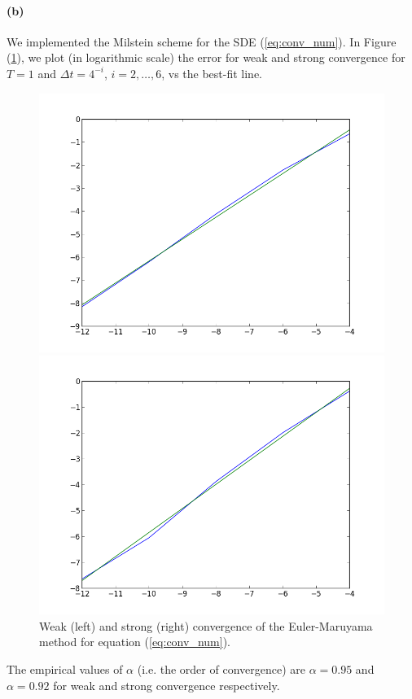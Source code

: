 \documentclass[a4paper,11pt]{article}
\theoremstyle{definition}
\theoremstyle{plain}
\theoremstyle{remark}
\begin{document}
\paragraph*{(b)}

We implemented the Milstein scheme for the SDE (\ref{eq:conv_num}).
In Figure (\ref{figure:ex10_mil}), we plot (in logarithmic scale) the error for weak and strong convergence for $T=1$ and $\Delta t = 4^{-i}$, $i=2,\dots,6$, vs the best-fit line.
\begin{figure}[htbp]
\centering
\begin{minipage}[c]{.47\textwidth}
\includegraphics[width=\textwidth,
keepaspectratio]{ex10_mil_w.png}
\end{minipage}
\hspace{4mm}
\begin{minipage}[c]{.47\textwidth}
\includegraphics[width=\textwidth,
keepaspectratio]{ex10_mil_s.png}
\end{minipage}
\caption{ \label{figure:ex10_mil} Weak (left) and strong (right) convergence of the Euler-Maruyama method for equation (\ref{eq:conv_num}).}
\end{figure}
The empirical values of $\alpha$ (i.e. the order of convergence) are $\alpha = 0.95$ and $\alpha = 0.92$ for weak and strong convergence respectively.
\end{document}
